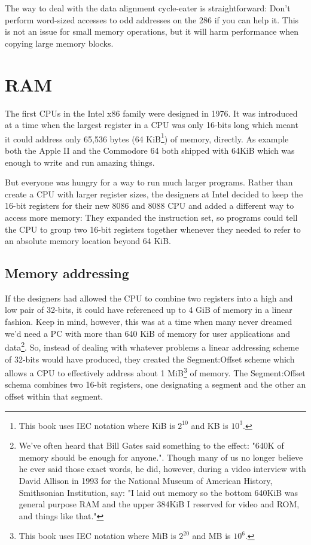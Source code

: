 \documentclass[book.tex]{subfiles}
\begin{document}
\par
The way to deal with the data alignment cycle-eater is straightforward: Don't perform word-sized accesses to odd addresses on the 286 if you can help it. This is not an issue for small memory operations, but it will harm performance when copying large memory blocks. 



\section{RAM}
The first CPUs in the Intel x86 family were designed in 1976. It was introduced at a time when the largest register in a CPU was only 16-bits long which meant it could address only 65,536 bytes (64 KiB\footnote{This book uses IEC notation where KiB is $2^{10}$ and KB is $10^3$.}) of memory, directly. As example both  the Apple II and the Commodore 64 both shipped with 64KiB which was enough to write and run amazing things.\\

\par
But everyone was hungry for a way to run much larger programs. Rather than create a CPU with larger register sizes, the designers at Intel decided to keep the 16-bit registers for their new 8086 and 8088 CPU and added a different way to access more memory: They expanded the instruction set, so programs could tell the CPU to group  two 16-bit registers together whenever they needed to refer to an absolute memory location beyond 64 KiB.\\

\subsection{Memory addressing}
If the designers had allowed the CPU to combine two registers into a high and low pair of 32-bits, it could have referenced up to 4 GiB of memory in a linear fashion. Keep in mind, however, this was at a time when many never dreamed we'd need a PC with more than 640 KiB of memory for user applications and data\footnote{We've often heard that Bill Gates said something to the effect: "640K of memory should be enough for anyone.". Though many of us no longer believe he ever said those exact words, he did, however, during a video interview with David Allison in 1993 for the National Museum of American History, Smithsonian Institution, say: "I laid out memory so the bottom 640KiB was general purpose RAM and the upper 384KiB I reserved for video and ROM, and things like that."}. So, instead of dealing with whatever problems a linear addressing scheme of 32-bits would have produced, they created the Segment:Offset scheme 
which allows a CPU to effectively address about 1 MiB\footnote{This book uses IEC notation where MiB is $2^{20}$ and MB is $10^6$.} of memory. The Segment:Offset schema combines two 16-bit registers, one designating a segment and the other an offset within that segment.
\\
\end{document}
